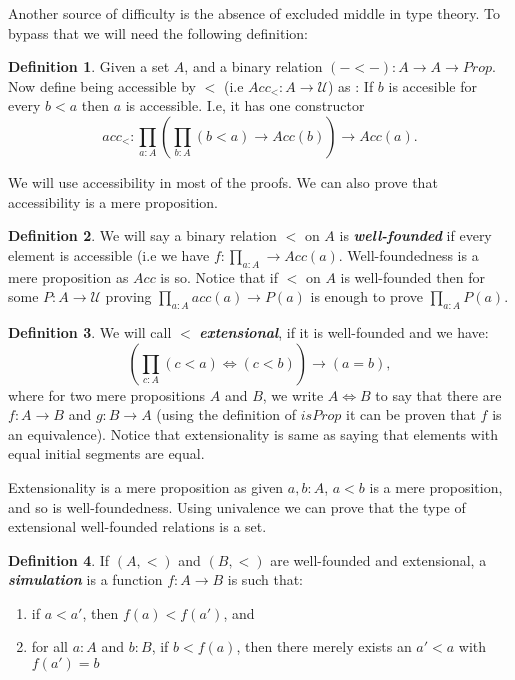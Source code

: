 \documentclass[10pt]{article}
\theoremstyle{definition}
\newtheorem{definition}{Definition}[section]
\theoremstyle{plain}
\theoremstyle{remark}
\newcommand{\U}{\mathscr{U}}
\begin{document}
Another source of difficulty is the absence of excluded middle in type theory. To bypass that
we will need the following definition:

\begin{definition}\label{D:Acc}
Given a set $A$, and a binary relation $(-<-) : A \to A \to Prop$. Now define being 
accessible by $<$ (i.e ${Acc}_{<} : A \to \U$) as : If $b$ is accesible for every $b<a$ 
then $a$ is accessible. I.e, it has one constructor 
\[ {acc}_< : \prod_{a : A} \left( \prod_{b : A} (b<a) \to {Acc}(b) \right) 
\to {Acc}(a). \]

\end{definition}
We will use accessibility in most of the proofs. We can also prove that accessibility is a 
mere proposition. 

\begin{definition}\label{D:WF}
We will say a binary relation $<$ on $A$ is \textbf{\textit{well-founded}} if every element
is accessible (i.e we have $f : \prod_{a : A} \to Acc(a)$. Well-foundedness is a mere 
proposition as ${Acc}$ is so. Notice that if $<$ on $A$ is well-founded then for some 
$P : A \to \U$ proving $\prod_{a:A} acc(a) \to P(a)$ is enough to prove $\prod_{a : A} P(a)$.
\end{definition}

\begin{definition}\label{D:Ext}
We will call $<$ \textbf{\textit{extensional}}, if it is well-founded and we have:
\[ \left( \prod_{c : A}  (c<a) \iff (c<b) \right) \to (a = b),\]
where for two mere propositions $A$ and $B$, we write $A\iff B$ to say that there are 
$f : A \to B$ and $g : B \to A$ (using the definition of ${isProp}$ it can be proven 
that $f$ is an equivalence). Notice that extensionality is same as saying that elements 
with equal initial segments are equal.
\end{definition} 

Extensionality is a mere proposition as given $a,b:A$, $a<b$ is a mere proposition, and so
is well-foundedness. Using univalence we can prove that the type of extensional well-founded
relations is a set.

\begin{definition}\label{D:sim}
If $(A,<)$ and $(B,<)$ are well-founded and extensional, a \textbf{\textit{simulation}} is
a function $f : A \to B$ is such that:
\begin{enumerate}
\item if $a < a'$, then $f(a) < f(a')$, and
\item for all $a : A$ and $b : B$, if $b < f(a)$, then there merely exists an $a' < a$ with
      $f(a') = b$
\end{enumerate}
\end{definition} 
\end{document}

